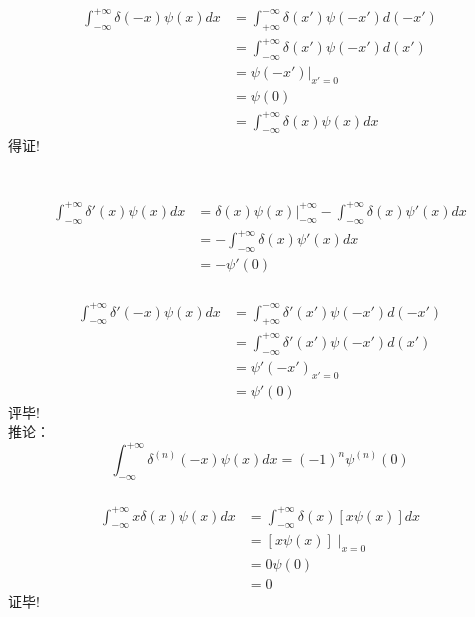 \begin{frame}
	  \frametitle{}
	  \证 ~  \[
		\begin{aligned}
			\int_{-\infty}^{+\infty} \delta(-x) \psi (x) d x &= \int_{+\infty}^{-\infty} \delta(x') \psi (-x') d (-x') \\
			&= \int_{-\infty}^{+\infty} \delta(x') \psi (-x') d (x') \\
			&=  \psi (-x') | _{x'=0}\\
			&=  \psi (0) \\
			&=  \int_{-\infty}^{+\infty} \delta(x) \psi (x) d x 
		\end{aligned}
		   \]
		得证!
\end{frame}

\begin{frame}
	\frametitle{}
	\证 ~  \[
	  \begin{aligned}
		\int_{-\infty}^{+\infty} \delta'(x) \psi (x) d x &= \delta(x) \psi (x)|_{-\infty}^{+\infty} - \int_{-\infty}^{+\infty} \delta(x) \psi' (x) d x \\
		  &=  - \int_{-\infty}^{+\infty} \delta(x) \psi' (x) d x \\
		  &=  - \psi' (0)
	  \end{aligned}
		 \]
\end{frame}

\begin{frame}
	  \frametitle{}
	  \[
		\begin{aligned}
		  \int_{-\infty}^{+\infty} \delta'(-x) \psi (x) d x &= \int_{+\infty}^{-\infty} \delta'(x') \psi (-x') d (-x') \\
			&= \int_{-\infty}^{+\infty} \delta'(x') \psi (-x') d (x') \\
			&=  \psi' (-x') _{x'=0}\\
			&=  \psi' (0) 
		\end{aligned}
		   \]
		评毕!\\ \vspace{1em}
		推论：\[ \int_{-\infty}^{+\infty} \delta^{(n)}(-x) \psi (x) d x = (-1)^n \psi^{(n)} (0)\]
\end{frame}

\begin{frame}
	\frametitle{}
	\例 [3. 试证明 ]
	{\[ x\delta(x)  = 0\]}
	\证 \[
		\begin{aligned}
		  \int_{-\infty}^{+\infty} x\delta(x) \psi (x) d x &= \int_{-\infty}^{+\infty} \delta(x) [x \psi (x)] d x \\
		    &=  [x \psi (x)] \mid_{x=0} \\
			&=  0\psi (0) \\
			&=  0
		\end{aligned}
		   \]
		证毕!
\end{frame}

